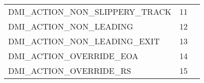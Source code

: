 \documentclass{template/openetcs_article}
\begin{document}
\begin{longtable}{|l|l|l|}
	&	\begin{minipage}[t]{0.30\linewidth} \end{minipage}\\
		\hline
		\begin{minipage}[t]{0.60\linewidth}	DMI\_ACTION\_NON\_SLIPPERY\_TRACK\end{minipage}
	&	\begin{minipage}[t]{0.15\linewidth} 11 	\end{minipage}
	&	\begin{minipage}[t]{0.30\linewidth} \end{minipage}\\
		\hline
		\begin{minipage}[t]{0.60\linewidth}	DMI\_ACTION\_NON\_LEADING\end{minipage}
	&	\begin{minipage}[t]{0.15\linewidth} 12 	\end{minipage}
	&	\begin{minipage}[t]{0.30\linewidth} \end{minipage}\\
		\hline
		\begin{minipage}[t]{0.60\linewidth}	DMI\_ACTION\_NON\_LEADING\_EXIT\end{minipage}
	&	\begin{minipage}[t]{0.15\linewidth} 13 	\end{minipage}
	&	\begin{minipage}[t]{0.30\linewidth} \end{minipage}\\
		\hline
		\begin{minipage}[t]{0.60\linewidth}	DMI\_ACTION\_OVERRIDE\_EOA\end{minipage}
	&	\begin{minipage}[t]{0.15\linewidth} 14 	\end{minipage}
	&	\begin{minipage}[t]{0.30\linewidth} \end{minipage}\\
		\hline
		\begin{minipage}[t]{0.60\linewidth}	DMI\_ACTION\_OVERRIDE\_RS\end{minipage}
	&	\begin{minipage}[t]{0.15\linewidth} 15 	\end{minipage}
	&	\begin{minipage}[t]{0.30\linewidth} \end{minipage}\\
		\hline

\end{longtable}
\end{document}
